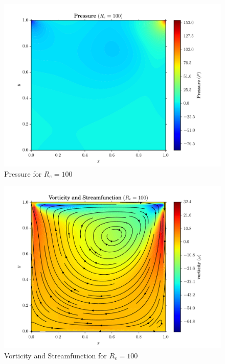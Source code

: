 \documentclass[addpoints]{exam}
\begin{document}
\begin{questions}
\begin{solution}
\begin{figure}[H]
\centering
\includegraphics[width=.75\textwidth]{figs/pressure_100.pdf}
\caption{Pressure for $R_{e}=100$}
\label{fig:pressure_re100}
\end{figure}

\begin{figure}[H]
\centering
\includegraphics[width=.75\textwidth]{figs/vorticity_streamfunction_100.pdf}
\caption{Vorticity and Streamfunction for $R_{e}=100$}
\label{fig:vorticity_streamfunction_re100}
\end{figure}


\end{solution}
\end{questions}
\end{document}
